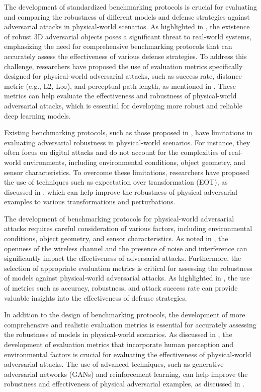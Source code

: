\documentclass[11pt,a4paper]{article}
\begin{document}
The development of standardized benchmarking protocols is crucial for evaluating and comparing the robustness of different models and defense strategies against adversarial attacks in physical-world scenarios. As highlighted in \cite{arxiv:1707.07397}, the existence of robust 3D adversarial objects poses a significant threat to real-world systems, emphasizing the need for comprehensive benchmarking protocols that can accurately assess the effectiveness of various defense strategies. To address this challenge, researchers have proposed the use of evaluation metrics specifically designed for physical-world adversarial attacks, such as success rate, distance metric (e.g., L2, L$\infty$), and perceptual path length, as mentioned in \cite{doi:10.24963/ijcai.2021/694}. These metrics can help evaluate the effectiveness and robustness of physical-world adversarial attacks, which is essential for developing more robust and reliable deep learning models.

Existing benchmarking protocols, such as those proposed in \cite{doi:10.1109/access.2018.2807385}, have limitations in evaluating adversarial robustness in physical-world scenarios. For instance, they often focus on digital attacks and do not account for the complexities of real-world environments, including environmental conditions, object geometry, and sensor characteristics. To overcome these limitations, researchers have proposed the use of techniques such as expectation over transformation (EOT), as discussed in \cite{doi:10.1007/978-3-030-10925-7_4}, which can help improve the robustness of physical adversarial examples to various transformations and perturbations.

The development of benchmarking protocols for physical-world adversarial attacks requires careful consideration of various factors, including environmental conditions, object geometry, and sensor characteristics. As noted in \cite{doi:10.1109/lcomm.2019.2901469}, the openness of the wireless channel and the presence of noise and interference can significantly impact the effectiveness of adversarial attacks. Furthermore, the selection of appropriate evaluation metrics is critical for assessing the robustness of models against physical-world adversarial attacks. As highlighted in \cite{doi:10.1126/science.aaw4399}, the use of metrics such as accuracy, robustness, and attack success rate can provide valuable insights into the effectiveness of defense strategies.

In addition to the design of benchmarking protocols, the development of more comprehensive and realistic evaluation metrics is essential for accurately assessing the robustness of models in physical-world scenarios. As discussed in \cite{doi:10.1049/cit2.12028}, the development of evaluation metrics that incorporate human perception and environmental factors is crucial for evaluating the effectiveness of physical-world adversarial attacks. The use of advanced techniques, such as generative adversarial networks (GANs) and reinforcement learning, can help improve the robustness and effectiveness of physical adversarial examples, as discussed in \cite{doi:10.1109/cvpr46437.2021.00846}.
\end{document}
